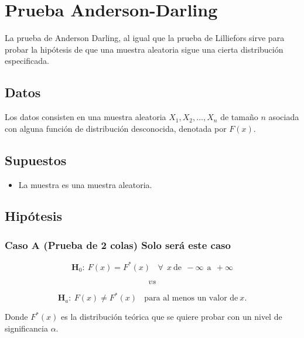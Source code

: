 \documentclass[
  a4paper,
  oneside,
  openany]{book}
\providecommand{\tightlist}{%
  \setlength{\itemsep}{0pt}\setlength{\parskip}{0pt}}
\begin{document}
\hypertarget{prueba-anderson-darling}{%
\chapter{Prueba Anderson-Darling}\label{prueba-anderson-darling}}

La prueba de Anderson Darling, al igual que la prueba de Lilliefors sirve para probar la hipótesis de que una muestra aleatoria sigue una cierta distribución especificada.

\hypertarget{datos-18}{%
\section{Datos}\label{datos-18}}

Los datos consisten en una muestra aleatoria \(X_{1},X_{2},\ldots,X_{n}\) de tamaño \(n\) asociada con alguna función de distribución desconocida, denotada por \(F(x)\).

\hypertarget{supuestos-16}{%
\section{Supuestos}\label{supuestos-16}}

\begin{itemize}
\tightlist
\item
  La muestra es una muestra aleatoria.
\end{itemize}

\hypertarget{hipuxf3tesis-17}{%
\section{Hipótesis}\label{hipuxf3tesis-17}}

\hypertarget{caso-a-prueba-de-2-colas-solo-seruxe1-este-caso}{%
\subsection*{Caso A (Prueba de 2 colas) Solo será este caso}\label{caso-a-prueba-de-2-colas-solo-seruxe1-este-caso}}


\[\textbf{H}_0: \ F(x)=F^*(x) \ \ \ \ \forall\ \ x\  \mbox{de} \ \ -\infty \ \ \mbox{a} \ \  +\infty\]

\[vs\]

\[\textbf{H}_a: \ F(x) \neq F^*(x) \ \ \ \ \mbox{para al menos un  valor de} \  x.\]

Donde \(F^*(x)\) es la distribución teórica que se quiere probar con un nivel de significancia \(\alpha\).
\end{document}
